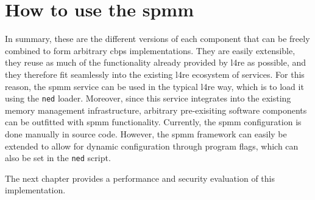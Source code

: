\section{How to use the \acs{spmm}}
\label{sec:how-to-use-the-spmm}

In summary, these are the different versions of each component that can be freely combined to form arbitrary \ac{cbps} implementations.
They are easily extensible, they reuse as much of the functionality already provided by \ac{l4re} as possible, and they therefore fit seamlessly into the existing \ac{l4re} ecosystem of services.
For this reason, the \ac{spmm} service can be used in the typical \ac{l4re} way, which is to load it using the \texttt{ned} loader.
Moreover, since this service integrates into the existing memory management infrastructure, arbitrary pre-exisiting software components can be outfitted with \ac{spmm} functionality.
Currently, the \ac{spmm} configuration is done manually in source code.
However, the \ac{spmm} framework can easily be extended to allow for dynamic configuration through program flags, which can also be set in the \texttt{ned} script.

The next chapter provides a performance and security evaluation of this implementation.
